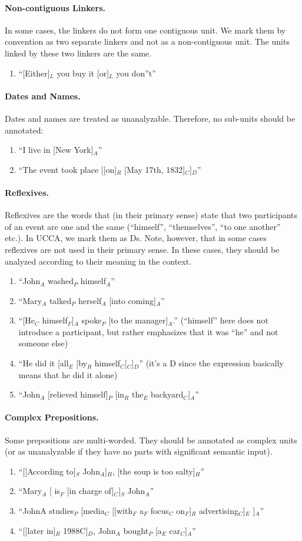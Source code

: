 \documentclass[11pt]{article}
\newcommand{\be}{\begin{enumerate}}
\newcommand{\ee}{\end{enumerate}}
\begin{document}
\paragraph{
Non-contiguous Linkers.} In some cases, the linkers do not form one contiguous unit. We mark them by convention as two separate linkers and not as a non-contiguous unit. The units linked by these two linkers are the same.
\be \item
``[Either]$_L$ you buy it [or]$_L$ you don''t''
\ee

\paragraph{
Dates and Names.} Dates and names are treated as unanalyzable. Therefore, no sub-units should be annotated:
\be \item
``I live in [New York]$_A$''
\item
``The event took place [[on]$_R$ [May 17th, 1832]$_C$]$_D$''
\ee

\paragraph{
Reflexives.} Reflexives are the words that (in their primary sense) state that two participants of an event are one and the same (``himself'', ``themselves'', ``to one another'' etc.). In UCCA, we mark them as Ds. Note, however, that in some cases reflexives are not used in their primary sense. In these cases, they should be analyzed according to their meaning in the context.
\be \item
``John$_A$ washed$_P$ himself$_A$''
\item
``Mary$_A$ talked$_P$ herself$_A$ [into coming]$_A$''
\item
``[He$_C$ himself$_F$]$_A$ spoke$_P$ [to the manager]$_A$.'' (``himself'' here does not introduce a participant, but rather emphasizes that it was ``he'' and not someone else)
\item
``He did it [all$_E$ [by$_R$ himself$_C$]$_C$]$_D$'' (it's a D since the expression basically means that he did it alone)
\item
``John$_A$ [relieved himself]$_P$ [in$_R$ the$_E$ backyard$_C$]$_A$''
\ee

\paragraph{Complex Prepositions.} Some prepositions are multi-worded. They should be annotated as complex units (or as unanalyzable if they have no parts with significant semantic input).
\be \item
``[[According  to]$_S$ John$_A$]$_H$, [the soup is too salty]$_H$''
\item
``Mary$_A$ [ is$_F$ [in charge of]$_C$]$_S$ John$_A$''
\item
``John­A studies$_P$ [media$_C$ [[with$_F$ a$_F$ focus$_C$ on$_F$]$_R$ advertising$_C$]$_E$ ]$_A$''
\item
``[[later in]$_R$ 1988C]$_D$, John$_A$ bought$_P$ [a$_E$ car$_C$]$_A$''
\ee
\end{document}
